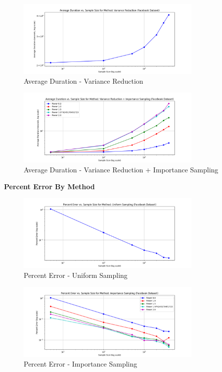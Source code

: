 \documentclass[11pt]{article}
\newcommand{\subsubsubsection}[1]{
  \vspace{1em} %
  \noindent\textbf{#1} %
  \vspace{0.5em} %
}
\begin{document}
\begin{figure}[H]
    \centering
    \includegraphics[width=0.8\textwidth]{plots/durations/avg_duration_Variance Reduction.png}
    \caption{Average Duration - Variance Reduction}
    \label{fig:avg_duration_variance}
\end{figure}

\begin{figure}[H]
    \centering
    \includegraphics[width=0.8\textwidth]{plots/durations/avg_duration_Variance Reduction + Importance Sampling.png}
    \caption{Average Duration - Variance Reduction + Importance Sampling}
    \label{fig:avg_duration_variance_importance}
\end{figure}

\subsubsubsection{Percent Error By Method}
\begin{figure}[H]
    \centering
    \includegraphics[width=0.8\textwidth]{plots/percent-errors/percent_error_Uniform Sampling.png}
    \caption{Percent Error - Uniform Sampling}
    \label{fig:percent_error_uniform}
\end{figure}

\begin{figure}[H]
    \centering
    \includegraphics[width=0.8\textwidth]{plots/percent-errors/percent_error_Importance Sampling.png}
    \caption{Percent Error - Importance Sampling}
    \label{fig:percent_error_importance}
\end{figure}
\end{document}
